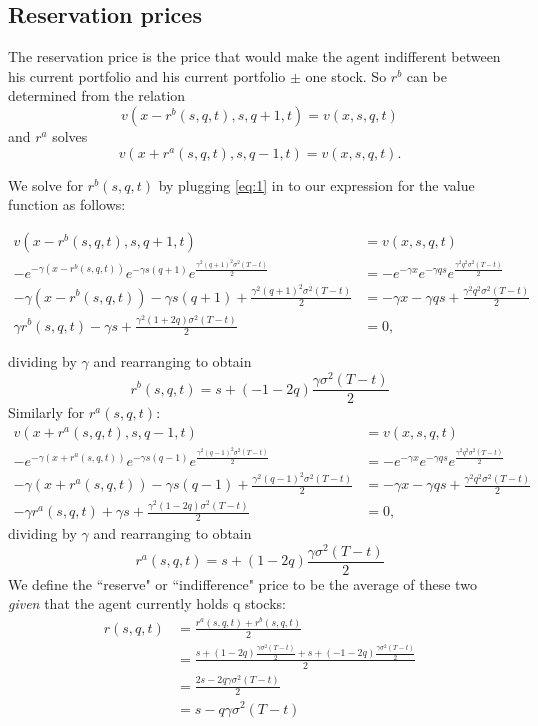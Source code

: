 \subsection{Reservation prices}

The reservation price is the price that would make the agent indifferent between his current portfolio and his current portfolio $\pm$ one stock. So $r^b$ can be determined from the relation
\begin{equation} \label{eq:1}
    v(x-r^b(s,q,t),s,q+1,t)=v(x,s,q,t)
\end{equation}
and $r^a$ solves
\begin{equation}
    v(x+r^a(s,q,t),s,q-1,t)=v(x,s,q,t).
\end{equation}

We solve for $r^b(s,q,t)$ by plugging \ref{eq:1} in to our expression for the value function as follows:

\begin{align*}
    v(x-r^b(s,q,t),s,q+1,t)&=v(x,s,q,t)\\
    -e^{-\gamma(x-r^b(s,q,t))}e^{-\gamma s(q+1)}e^{\frac{\gamma^2(q+1)^2\sigma^2(T-t)}{2}}&=-e^{-\gamma x}e^{-\gamma q s}e^{\frac{\gamma^2q^2\sigma^2(T-t)}{2}}\\
    -\gamma(x-r^b(s,q,t))-\gamma s(q+1) + \frac{\gamma^2(q+1)^2\sigma^2(T-t)}{2} &= -\gamma x-\gamma q s + \frac{\gamma^2q^2\sigma^2(T-t)}{2}\\
    \gamma r^b(s,q,t)-\gamma s + \frac{\gamma^2(1+2q)\sigma^2(T-t)}{2} &=0,
\end{align*}

dividing by $\gamma$ and rearranging to obtain
\begin{equation}
    r^b(s,q,t)=s+(-1-2q)\frac{\gamma\sigma^2(T-t)}{2}
\end{equation}
Similarly for $r^a(s,q,t)$:
\begin{align*}
    v(x+r^a(s,q,t),s,q-1,t)&=v(x,s,q,t)\\
    -e^{-\gamma(x+r^a(s,q,t))}e^{-\gamma s(q-1)}e^{\frac{\gamma^2(q-1)^2\sigma^2(T-t)}{2}}&=-e^{-\gamma x}e^{-\gamma q s}e^{\frac{\gamma^2q^2\sigma^2(T-t)}{2}}\\
    -\gamma(x+r^a(s,q,t))-\gamma s(q-1)+\frac{\gamma^2(q-1)^2\sigma^2(T-t)}{2}&=-\gamma x-\gamma q s + \frac{\gamma^2q^2\sigma^2(T-t)}{2}\\
    -\gamma r^a(s,q,t) + \gamma s + \frac{\gamma^2(1-2q)\sigma^2(T-t)}{2}&=0,
\end{align*}
dividing by $\gamma$ and rearranging to obtain
\begin{equation}
    r^a(s,q,t)=s+(1-2q)\frac{\gamma\sigma^2(T-t)}{2}
\end{equation}
We define the ``reserve" or ``indifference" price to be the average of these two \textit{given} that the agent currently holds q stocks:
\begin{align*}
    r(s,q,t)&=\frac{r^a(s,q,t)+r^b(s,q,t)}{2}\\
    &=\frac{s+(1-2q)\frac{\gamma\sigma^2(T-t)}{2}+s+(-1-2q)\frac{\gamma\sigma^2(T-t)}{2}}{2}\\
    &=\frac{2s-2q\gamma\sigma^2(T-t)}{2}\\
    &=s-q\gamma\sigma^2(T-t)
\end{align*}

